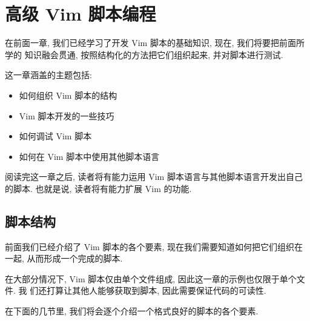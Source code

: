 \chapter{高级 Vim 脚本编程}
\label{chap:extended_vim_scripting}

在前面一章, 我们已经学习了开发 Vim 脚本的基础知识, 现在, 我们将要把前面所学的
知识融会贯通, 按照结构化的方法把它们组织起来, 并对脚本进行测试.

这一章涵盖的主题包括:
\begin{itemize}
    \item 如何组织 Vim 脚本的结构
    \item Vim 脚本开发的一些技巧
    \item 如何调试 Vim 脚本
    \item 如何在 Vim 脚本中使用其他脚本语言
\end{itemize}

阅读完这一章之后, 读者将有能力运用 Vim 脚本语言与其他脚本语言开发出自己的脚本.
也就是说, 读者将有能力扩展 Vim 的功能.

\section{脚本结构}
\label{sec:script_structure}

前面我们已经介绍了 Vim 脚本的各个要素, 现在我们需要知道如何把它们组织在一起,
从而形成一个完成的脚本.

在大部分情况下, Vim 脚本仅由单个文件组成, 因此这一章的示例也仅限于单个文件. 我
们还打算让其他人能够获取到脚本, 因此需要保证代码的可读性.

在下面的几节里, 我们将会逐个介绍一个格式良好的脚本的各个要素.

